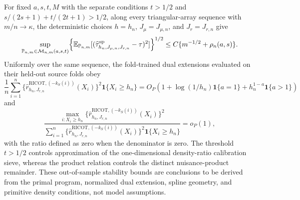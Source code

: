 For fixed \(a,s,t,M\) with the separate conditions \(t>1/2\) and \(s/(2s+1)+t/(2t+1)>1/2\), along every triangular-array sequence with \(m/n\to\kappa\), the deterministic choices \(h=h_n\), \(J_\mu=J_{\mu,n}\), and \(J_r=J_{r,n}\) give
\[
\sup_{\mathbb P_{n,m}\in\mathcal M_{n,m}(a,s,t)}\Bigl\{\mathbb E_{\mathbb P_{n,m}}[(\widehat\tau^{\mathrm{sp}}_{h_n,J_{\mu,n},J_{r,n}}-\tau)^2]\Bigr\}^{1/2}\le C\{m^{-1/2}+\rho_n(a,s)\}.
\]
Uniformly over the same sequence, the fold-trained dual extensions evaluated on their held-out source folds obey
\[
\frac1n\sum_{i=1}^n\{\widehat r^{\mathrm{RICOT},(-k_S(i))}_{h_n,J_{r,n}}(X_i)\}^2\mathbf 1\{X_i\ge h_n\}=O_P\!\left(1+\log(1/h_n)\mathbf 1\{a=1\}+h_n^{1-a}\mathbf 1\{a>1\}\right)
\]
and
\[
\frac{\max_{i:X_i\ge h_n}\{\widehat r^{\mathrm{RICOT},(-k_S(i))}_{h_n,J_{r,n}}(X_i)\}^2}{\sum_{i=1}^n\{\widehat r^{\mathrm{RICOT},(-k_S(i))}_{h_n,J_{r,n}}(X_i)\}^2\mathbf 1\{X_i\ge h_n\}}=o_P(1),
\]
with the ratio defined as zero when the denominator is zero. The threshold \(t>1/2\) controls approximation of the one-dimensional density-ratio calibration sieve, whereas the product relation controls the distinct nuisance-product remainder. These out-of-sample stability bounds are conclusions to be derived from the primal program, normalized dual extension, spline geometry, and primitive density conditions, not model assumptions.